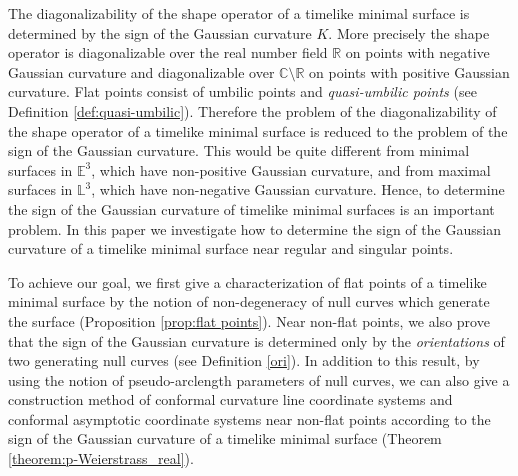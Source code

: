 \documentclass[11pt,reqno]{amsart}
\theoremstyle{plain} %
\theoremstyle{definition}
\begin{document}
 The diagonalizability of the shape operator of a timelike minimal surface is determined by the sign of the Gaussian curvature $K$. More precisely the shape operator is diagonalizable over  the real number field $\mathbb{R}$ on points with negative Gaussian curvature and diagonalizable over $\mathbb{C}\setminus \mathbb{R}$ on points with positive Gaussian curvature. Flat points consist of umbilic points and {\it quasi-umbilic points} (see Definition \ref{def:quasi-umbilic}). Therefore the problem of the diagonalizability of the shape operator of a timelike minimal surface is reduced to the problem of the sign of the Gaussian curvature. This would be quite different from minimal surfaces in $\mathbb{E}^3$, which have non-positive Gaussian curvature, and from maximal surfaces in $\mathbb{L}^3$, which have non-negative Gaussian curvature. Hence, to determine the sign of the Gaussian curvature of timelike minimal surfaces is an important problem. In this paper we investigate how to determine the sign of the Gaussian curvature of a timelike minimal surface near regular and singular points.%
 
To achieve our goal, we first give a characterization of flat points of a timelike minimal surface by the notion of non-degeneracy of null curves which generate the surface (Proposition \ref{prop:flat points}). Near non-flat points, we also prove that the sign of the Gaussian curvature is determined only by the {\it orientations} of two generating null curves (see Definition \ref{ori}).  %
In addition to this result, by using the notion of pseudo-arclength parameters of null curves, we can also give a construction method of conformal curvature line coordinate systems and conformal asymptotic coordinate systems near non-flat points according to the sign of the Gaussian curvature of a timelike minimal surface (Theorem \ref{theorem:p-Weierstrass_real}). 
\end{document}
